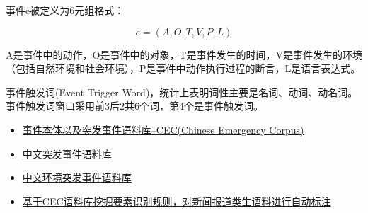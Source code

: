 
事件e被定义为6元组格式：

\begin{equation}
e = (A, O, T, V, P, L)
\end{equation}

A是事件中的动作，O是事件中的对象，T是事件发生的时间，V是事件发生的环境（包括自然环境和社会环境），P是事件中动作执行过程的断言，L是语言表达式。

事件触发词(Event Trigger Word)，统计上表明词性主要是名词、动词、动名词。事件触发词窗口采用前3后2共6个词，第4个是事件触发词。

\begin{itemize}
\tightlist
\item
  \href{http://blog.csdn.net/shijiebei2009/article/details/44538257}
  {事件本体以及突发事件语料库--CEC(Chinese
  Emergency Corpus)}
\item
  \href{https://github.com/shijiebei2009/CEC-Corpus}
  {中文突发事件语料库}
\item
  \href{https://github.com/shijiebei2009/CEEC-Corpus}
  {中文环境突发事件语料库}
\item
  \href{https://github.com/shijiebei2009/CEC-Automatic-Annotation}
  {基于CEC语料库挖掘要素识别规则，对新闻报道类生语料进行自动标注}
\end{itemize}

